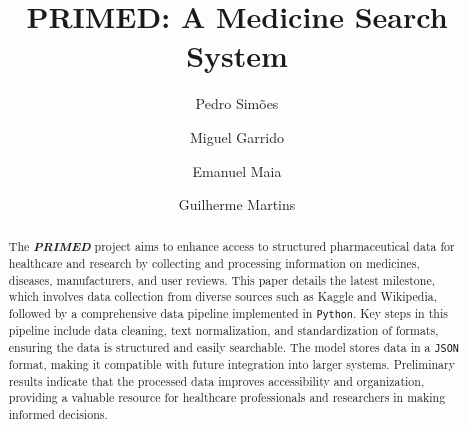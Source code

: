 \documentclass[sigconf]{acmart}
\begin{document}
\title{PRIMED: A Medicine Search System}

\author{Pedro Simões}

\author{Miguel Garrido}

\author{Emanuel Maia}

\author{Guilherme Martins}

\renewcommand{\shortauthors}{Pedro Simões, Miguel Garrido, Emanuel Maia and Guilherme Martins}

\begin{abstract}
The \textit{\textbf{PRIMED}} project aims to enhance access to structured pharmaceutical data for healthcare and research by collecting and processing information on medicines, diseases, manufacturers, and user reviews. This paper details the latest milestone, which involves data collection from diverse sources such as Kaggle and Wikipedia, followed by a comprehensive data pipeline implemented in \texttt{Python}. Key steps in this pipeline include data cleaning, text normalization, and standardization of formats, ensuring the data is structured and easily searchable. The model stores data in a \texttt{JSON} format, making it compatible with future integration into larger systems. Preliminary results indicate that the processed data improves accessibility and organization, providing a valuable resource for healthcare professionals and researchers in making informed decisions. \end{abstract}
\end{document}

